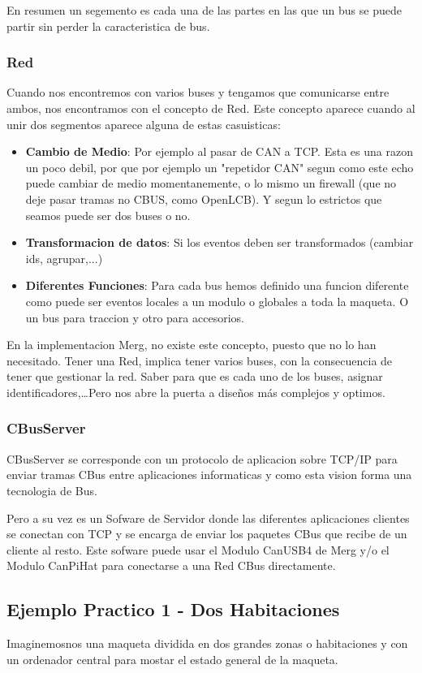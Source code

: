 En resumen un segemento es cada una de las partes en las que un bus se puede partir sin perder la caracteristica de bus.

\subsubsection{Red}
Cuando nos encontremos con varios buses y tengamos que comunicarse entre ambos, nos encontramos con el concepto de Red. Este concepto aparece cuando al unir dos segmentos aparece alguna de estas casuisticas:
\begin{itemize}
	\item \textbf{Cambio de Medio}: Por ejemplo al pasar de CAN a TCP. Esta es una razon un poco debil, por que por ejemplo un "repetidor CAN" segun como este echo puede cambiar de medio momentanemente, o lo mismo un firewall (que no deje pasar tramas no CBUS, como OpenLCB).
Y segun lo estrictos que seamos puede ser dos buses o no.
	\item \textbf{Transformacion de datos}: Si los eventos deben ser transformados (cambiar ids, agrupar,...) 
	\item \textbf{Diferentes Funciones}: Para cada bus hemos definido una funcion diferente como puede ser eventos locales a un modulo o globales a toda la maqueta. O un bus para traccion y otro para accesorios.
\end{itemize}

En la implementacion Merg, no existe este concepto, puesto que no lo han necesitado. Tener una Red, implica tener varios buses, con la consecuencia de tener que gestionar la red. Saber para que es cada uno de los buses, asignar identificadores,\dots Pero nos abre la puerta a diseños más complejos y optimos.

\subsubsection {CBusServer}
CBusServer se corresponde con un protocolo de aplicacion sobre TCP/IP para enviar tramas CBus entre aplicaciones informaticas y como esta vision forma una tecnologia de Bus.

Pero a su vez es un Sofware de Servidor donde las diferentes aplicaciones clientes se conectan con TCP y se encarga de enviar los paquetes CBus que recibe de un cliente al resto. Este sofware puede usar el Modulo CanUSB4 de Merg y/o el Modulo CanPiHat para conectarse a una Red CBus directamente.

\subsection{Ejemplo Practico 1 - Dos Habitaciones}
Imaginemosnos una maqueta dividida en dos grandes zonas o habitaciones y con un ordenador central para  mostar el estado general de la maqueta. 

